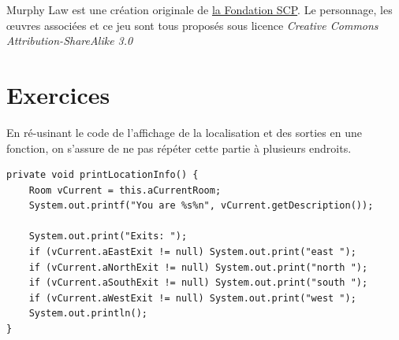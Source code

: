 \documentclass[a4paper,12pt]{report}
\begin{document}
Murphy Law est une création originale de \href{http://scp-wiki.wikidot.com/murphy-law-hub}{la Fondation SCP}. Le personnage, les œuvres associées et ce jeu sont tous proposés sous licence \emph{Creative Commons Attribution-ShareAlike 3.0}


\chapter{Exercices}

\setcounter{section}{7}
\setcounter{exercise}{4}


\begin{exercise}[subtitle=printLocationInfo]

En ré-usinant le code de l'affichage de la localisation et des sorties en une fonction, on s'assure de ne pas répéter cette partie à plusieurs endroits.

\begin{verbatim}
private void printLocationInfo() {
    Room vCurrent = this.aCurrentRoom;
    System.out.printf("You are %s%n", vCurrent.getDescription());
   
    System.out.print("Exits: ");
    if (vCurrent.aEastExit != null) System.out.print("east ");
    if (vCurrent.aNorthExit != null) System.out.print("north ");
    if (vCurrent.aSouthExit != null) System.out.print("south ");
    if (vCurrent.aWestExit != null) System.out.print("west ");
    System.out.println();
}
\end{verbatim}
\end{exercise}
\end{document}
